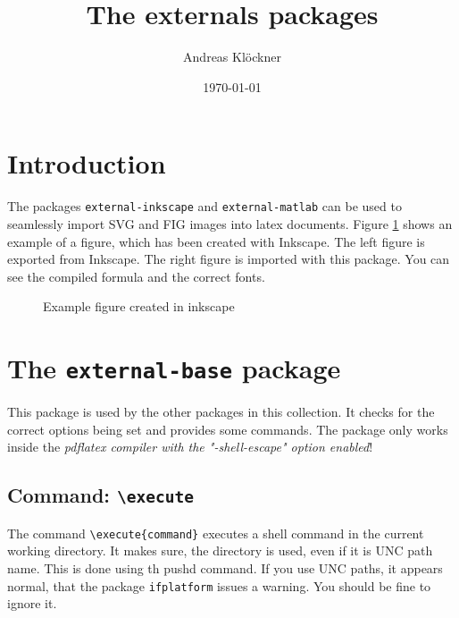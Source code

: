 \documentclass{article}
\title{The externals packages}
\author{Andreas Kl\"ockner}
\date{\today}
\let\otextbackslash\textbackslash
\renewcommand\textbackslash{{\rmfamily\otextbackslash}}
\begin{document}
\maketitle


\section{Introduction}

The packages \texttt{external-inkscape} and \texttt{external-matlab} can be used to seamlessly import SVG and FIG images into latex documents. Figure \ref{fig:example} shows an example of a figure, which has been created with Inkscape. The left figure is exported from Inkscape. The right figure is imported with this package. You can see the compiled formula and the correct fonts.

\begin{figure}[h!]%
  \centering%
  \hfill
  \hfill
  \hfill\hbox{}
\caption{Example figure created in inkscape}%
\label{fig:example}%
\end{figure}


\section{The \texttt{external-base} package}
This package is used by the other packages in this collection. It checks for the correct options being set and provides some commands. The package only works inside the \emph{pdflatex compiler with the "-shell-escape" option enabled}!

\subsection{Command: \texttt{\textbackslash execute}}
The command \texttt{\textbackslash execute\{command\}} executes a shell command in the current working directory. It makes sure, the directory is used, even if it is UNC path name. This is done using th pushd command. If you use UNC paths, it appears normal, that the package \texttt{ifplatform} issues a warning. You should be fine to ignore it.
\end{document}
